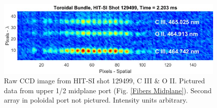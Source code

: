 \begin{center}
\begin{figure}
\centering
\includegraphics[width=6in]{HITSI_CCD_3}\caption{Raw CCD image from HIT-SI shot 129499, C III \& O II. Pictured data from upper 1/2 midplane port (Fig. \ref{Fibers Midplane}). Second array in poloidal port not pictured. Intensity units arbitrary. }\label{HITSI_CCD}
\end{figure}
\end{center}


